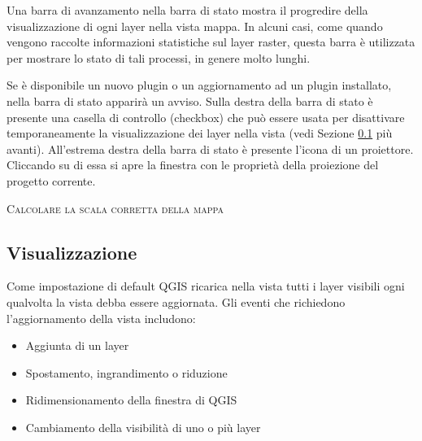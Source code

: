 Una barra di avanzamento nella barra di stato mostra il progredire della
visualizzazione di ogni layer nella vista mappa. In alcuni casi, come quando
vengono raccolte informazioni statistiche sul layer raster, questa barra è
utilizzata per mostrare lo stato di tali processi, in genere molto lunghi. 

Se è disponibile un nuovo plugin o un aggiornamento ad un plugin installato,
nella barra di stato apparirà un avviso. Sulla destra della barra di stato è
presente una casella di controllo (checkbox) che può essere usata per
disattivare temporaneamente la visualizzazione dei layer nella vista (vedi
Sezione \ref{subsec:redraw_events} più avanti). All'estrema destra della barra
di stato è presente l'icona di un proiettore. Cliccando su di essa si apre la
finestra con le proprietà della proiezione del progetto corrente.

\begin{Tip}\caption{\textsc{Calcolare la scala corretta della mappa}}
\end{Tip}

\subsection{Visualizzazione}\label{subsec:redraw_events}

Come impostazione di default QGIS ricarica nella vista tutti i layer visibili
ogni qualvolta la vista debba essere aggiornata. Gli eventi che richiedono
l'aggiornamento della vista includono:

\begin{itemize}
\item Aggiunta di un layer
\item Spostamento, ingrandimento o riduzione
\item Ridimensionamento della finestra di QGIS
\item Cambiamento della visibilità di uno o più layer
\end{itemize}

